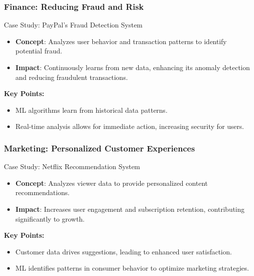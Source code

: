 \documentclass[aspectratio=169]{beamer}
\begin{document}
\begin{frame}[fragile]
    \frametitle{Finance: Reducing Fraud and Risk}
    \begin{block}{Case Study: PayPal’s Fraud Detection System}
        \begin{itemize}
            \item \textbf{Concept}: Analyzes user behavior and transaction patterns to identify potential fraud.
            \item \textbf{Impact}: Continuously learns from new data, enhancing its anomaly detection and reducing fraudulent transactions.
        \end{itemize}
    \end{block}

    \textbf{Key Points:}
    \begin{itemize}
        \item ML algorithms learn from historical data patterns.
        \item Real-time analysis allows for immediate action, increasing security for users.
    \end{itemize}
\end{frame}

\begin{frame}[fragile]
    \frametitle{Marketing: Personalized Customer Experiences}
    \begin{block}{Case Study: Netflix Recommendation System}
        \begin{itemize}
            \item \textbf{Concept}: Analyzes viewer data to provide personalized content recommendations.
            \item \textbf{Impact}: Increases user engagement and subscription retention, contributing significantly to growth.
        \end{itemize}
    \end{block}

    \textbf{Key Points:}
    \begin{itemize}
        \item Customer data drives suggestions, leading to enhanced user satisfaction.
        \item ML identifies patterns in consumer behavior to optimize marketing strategies.
    \end{itemize}
\end{frame}
\end{document}
